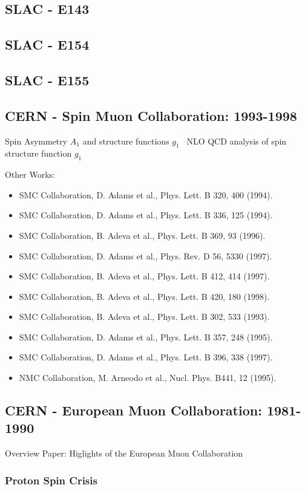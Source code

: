 \subsection{SLAC - E143} 
\subsection{SLAC - E154} 
\subsection{SLAC - E155}

\subsection{CERN - Spin Muon Collaboration: 1993-1998}
Spin Asymmetry $A_1$ and structure functions $g_1$~\cite{Adeva1998}
NLO QCD analysis of spin structure function $g_1$~\cite{Adeva1998a}

Other Works:
\begin{itemize}
	\item SMC Collaboration, D. Adams et al., Phys. Lett. B 320, 400 (1994).
	\item SMC Collaboration, D. Adams et al., Phys. Lett. B 336, 125 (1994).
	\item SMC Collaboration, B. Adeva et al., Phys. Lett. B 369, 93 (1996).
	\item SMC Collaboration, D. Adams et al., Phys. Rev. D 56, 5330 (1997).
	\item SMC Collaboration, B. Adeva et al., Phys. Lett. B 412, 414 (1997).
	\item SMC Collaboration, B. Adeva et al., Phys. Lett. B 420, 180 (1998).
	\item SMC Collaboration, B. Adeva et al., Phys. Lett. B 302, 533 (1993).
	\item SMC Collaboration, D. Adams et al., Phys. Lett. B 357, 248 (1995).
	\item SMC Collaboration, D. Adams et al., Phys. Lett. B 396, 338 (1997).
	\item NMC Collaboration, M. Arneodo et al., Nucl. Phys. B441, 12 (1995).
\end{itemize}

\subsection{CERN - European Muon Collaboration: 1981-1990}
Overview Paper: Higlights of the European Muon Collaboration
~\cite{Kullander1990a}
\subsubsection{Proton Spin Crisis}
